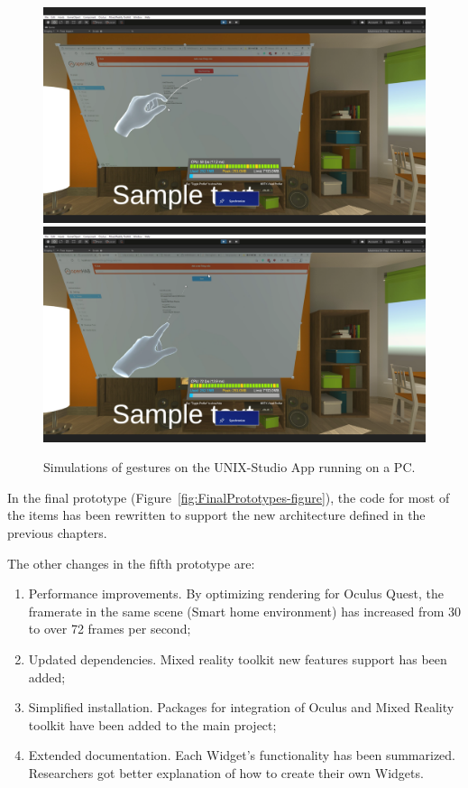 \begin{figure}
  \centering
    {\includegraphics[width=0.45\linewidth]{figures/InputSimulation1.png}}
    {\includegraphics[width=0.45\linewidth]{figures/InputSimulation2.png}}
  \caption{Simulations of gestures on the UNIX-Studio App running on a PC.}
  \label{fig:InputSimulation-figure}
\end{figure}

In the final prototype (Figure~\ref{fig:FinalPrototypes-figure}), the code for most of the items has been rewritten to support the new architecture defined in the previous chapters. 

The other changes in the fifth prototype are:
\begin{enumerate}
    \item Performance improvements. By optimizing rendering for Oculus Quest, the framerate in the same scene (Smart home environment) has increased from 30 to over 72 frames per second;
    \item Updated dependencies. Mixed reality toolkit new features support has been added;
    \item Simplified installation. Packages for integration of Oculus and Mixed Reality toolkit have been added to the main project;
    \item Extended documentation. Each Widget's functionality has been summarized. Researchers got better explanation of how to create their own Widgets.
\end{enumerate}


